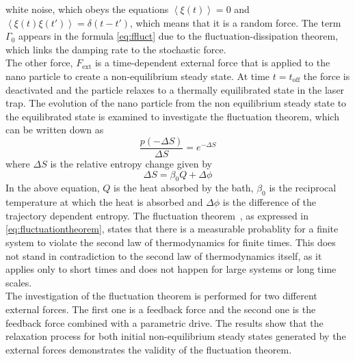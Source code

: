 \documentclass[12pt]{article}
\begin{document}
white noise, which obeys the equations $\left\langle\xi(t)\right\rangle= 0$ and $\left\langle\xi(t)\xi(t')\right\rangle= \delta(t-t')$, which means
that it is a random force. The term $\Gamma_0$ appears in the formula \eqref{eq:ffluct} 
due to the fluctuation-dissipation theorem, which links the damping rate to the stochastic force.\\
The other force, $F_\text{ext}$ is a time-dependent external force that is applied to the nano particle to create a non-equilibrium steady state. At
time $t = t_\text{off}$ the force is deactivated and the particle relaxes to a thermally equilibrated state in the laser trap. The evolution of the nano 
particle from the non equilibrium steady state to the equilibrated state is examined to investigate the fluctuation theorem, which can be written 
down as 
\begin{equation}
    \label{eq:fluctuationtheorem}
    \frac{p(-\Delta S)}{\Delta S} = e^{-\Delta S}
\end{equation}
where $\Delta S$ is the relative entropy change given by
\begin{equation}
    \Delta S = \beta_0 Q + \Delta \phi
\end{equation}
In the above equation, $Q$ is the heat absorbed by the bath, $\beta_0$ is the reciprocal temperature at which the heat is absorbed and 
$\Delta \phi$ is the difference of the trajectory dependent entropy. The fluctuation theorem~\cite{Searles1999}, as expressed in 
\eqref{eq:fluctuationtheorem}, states that there is a measurable probablity for a finite system to violate the second law of thermodynamics
for finite times. This does not stand in contradiction to the second law of thermodynamics itself, as it applies only to short times and does not 
happen for large systems or long time scales.\\
The investigation of the fluctuation theorem is performed for two different external forces. The first one is a feedback force and the second 
one is the feedback force combined with a parametric drive. The results show that the relaxation process for both initial non-equilibrium steady 
states generated by the external forces demonstrates the validity of the fluctuation theorem.\\

\end{document}
